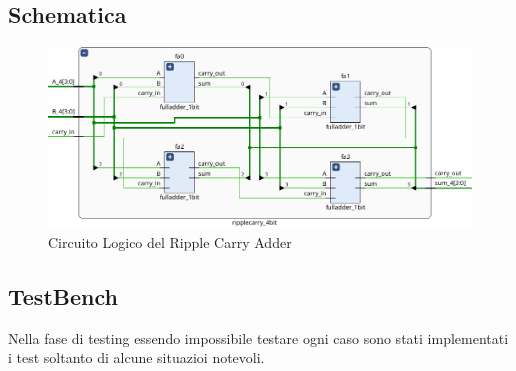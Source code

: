 \subsection{Schematica}
\begin{figure}[H]
    \centering
    \includegraphics[width=15cm]{resources/ripplecarry.png}
    \caption{Circuito Logico del Ripple Carry Adder}
    \label{fig:logic_circuit_ripplecarry}
\end{figure}

\subsection{TestBench}
Nella fase di testing essendo impossibile testare ogni caso sono stati implementati i test soltanto di alcune situazioi notevoli.

